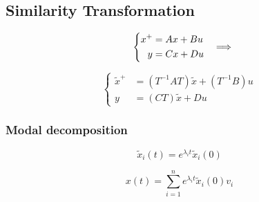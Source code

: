 \subsection{Similarity Transformation}
    \begin{minipage}{0.43\linewidth}
        \vspace{1pt}
        \begin{equation*}
            \left\{
                \begin{aligned}
                    x^+ &= Ax + Bu\\
                    y &= Cx + Du
                \end{aligned}
            \right. \parbox[t]{0.7cm}{$\quad\Longrightarrow$}
        \end{equation*} 
    \end{minipage}
    \begin{minipage}{0.56\linewidth}
        \begin{equation*}
            \left\{
                \begin{aligned}
                    \tilde{x}^+ &= (T^{-1}AT)\tilde{x} + (T^{-1}B)u\\
                    y &= (CT)\tilde{x} + Du
                \end{aligned}
            \right.
        \end{equation*}
    \end{minipage}
    \vspace{2pt}

\subsubsection{Modal decomposition}
\vspace{-5pt}
\begin{minipage}{0.49\linewidth}
    \begin{equation*}
        \tilde{x}_i(t) = e^{\lambda_it}\tilde{x}_i(0)
    \end{equation*} 
\end{minipage}
\begin{minipage}{0.49\linewidth}
    \begin{equation*}
        x(t) = \sum_{i=1}^{n}e^{\lambda_it}\tilde{x}_i(0)v_i
    \end{equation*}
\end{minipage}
\vspace*{0.2em}
